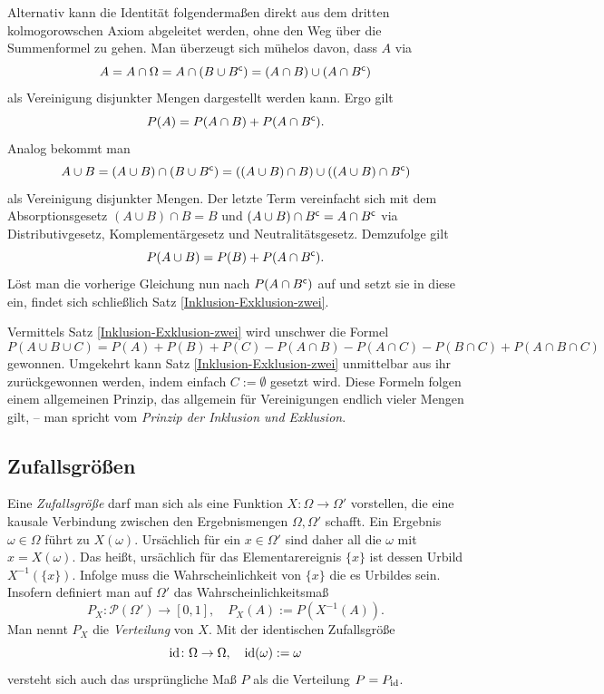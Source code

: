 \noindent
Alternativ kann die Identität folgendermaßen direkt aus dem dritten
kolmogorowschen Axiom abgeleitet werden, ohne den Weg über die Summenformel
zu gehen. Man überzeugt sich mühelos davon, dass $A$ via%
\[A = A\cap\Omega = A\cap(B\cup B^\mathsf c) = (A\cap B)\cup (A\cap B^\mathsf c)\]
als Vereinigung disjunkter Mengen dargestellt werden kann. Ergo gilt%
\[P(A) = P(A\cap B) + P(A\cap B^\mathsf c).\]
Analog bekommt man
\[A\cup B = (A\cup B)\cap (B\cup B^\mathsf c) =
((A\cup B)\cap B)\cup ((A\cup B)\cap B^\mathsf c)\]
als Vereinigung disjunkter Mengen. Der letzte Term vereinfacht sich
mit dem Absorptionsgesetz $(A\cup B)\cap B = B$ und $(A\cup B)\cap B^\mathsf c
= A\cap B^\mathsf c$ via Distributivgesetz, Komplementärgesetz und
Neutralitätsgesetz. Demzufolge gilt%
\[P(A\cup B) = P(B) + P(A\cap B^\mathsf c).\]
Löst man die vorherige Gleichung nun nach $P(A\cap B^\mathsf c)$ auf
und setzt sie in diese ein, findet sich schließlich Satz
\ref{Inklusion-Exklusion-zwei}.

Vermittels Satz \ref{Inklusion-Exklusion-zwei} wird unschwer die Formel
\[P(A\cup B\cup C) = P(A) + P(B) + P(C)
- P(A\cap B) - P(A\cap C) - P(B\cap C) + P(A\cap B\cap C)\]
gewonnen. Umgekehrt kann Satz \ref{Inklusion-Exklusion-zwei} unmittelbar
aus ihr zurückgewonnen werden, indem einfach $C:=\emptyset$ gesetzt
wird. Diese Formeln folgen einem allgemeinen Prinzip, das
allgemein für Vereinigungen endlich vieler Mengen gilt, -- man spricht
vom \emph{Prinzip der Inklusion und Exklusion}.

\subsection{Zufallsgrößen}

Eine \emph{Zufallsgröße} darf man
sich als eine Funktion $X\colon\Omega\to\Omega'$
vorstellen, die eine kausale Verbindung zwischen den Ergebnismengen
$\Omega,\Omega'$ schafft. Ein Ergebnis $\omega\in\Omega$ führt
zu $X(\omega)$. Ursächlich für ein $x\in\Omega'$ sind daher all die
$\omega$ mit $x=X(\omega)$. Das heißt, ursächlich für das
Elementarereignis $\{x\}$ ist dessen Urbild $X^{-1}(\{x\})$.
Infolge muss die Wahrscheinlichkeit von $\{x\}$ die es Urbildes sein.
Insofern definiert man auf $\Omega'$ das Wahrscheinlichkeitsmaß%
\[P_X\colon\mathcal P(\Omega')\to [0,1],\quad P_X(A) := P(X^{-1}(A)).\]
Man nennt $P_X$ die \emph{Verteilung} von $X$. Mit der
identischen Zufallsgröße
\[\operatorname{id}\colon\Omega\to\Omega,\quad \operatorname{id}(\omega) := \omega\]
versteht sich auch das ursprüngliche Maß $P$ als die Verteilung $P=P_{\operatorname{id}}$.

